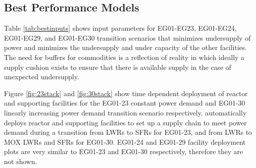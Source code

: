 \subsection{Best Performance Models}
Table \ref{tab:bestinputs} 
shows \deploy input parameters for
EG01-EG23, EG01-EG24, EG01-EG29, and EG01-EG30 transition scenarios
that minimizes undersupply of power and minimizes 
the undersupply and under capacity of the other facilities. 
The need for buffers for commodities is a reflection of reality
in which ideally a supply cushion exists to ensure that there 
is available supply in the case of unexpected undersupply. 

Figure \ref{fig:23stack} and \ref{fig:30stack} show
time dependent deployment of reactor and supporting facilities for 
the EG01-23 constant power demand and EG01-30 linearly increasing power demand 
transition scenario respectively. 
\deploy automatically deploys reactor and supporting facilities 
to set up a supply chain to meet power demand
during a transition from \glspl{LWR} to \glspl{SFR} for EG01-23, 
and from \glspl{LWR} to \gls{MOX} \glspl{LWR} and \glspl{SFR} for 
EG01-30. 
EG01-24 and EG01-29 facility deployment plots are very similar to 
EG01-23 and EG01-30 respectively, therefore they are not shown. 

